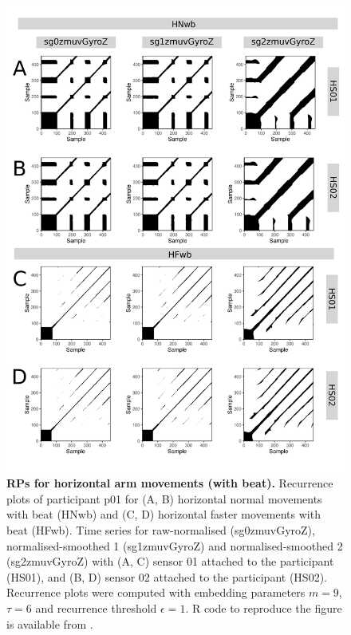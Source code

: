\begin{figure}[!h]
\centering
\includegraphics[height=0.8\textheight]{rps_Hwb_w500}
\caption{
	{\bf RPs for horizontal arm movements (with beat).}	
	Recurrence plots of participant p01 for 
	(A, B) horizontal normal movements with beat (HNwb) and
	(C, D) horizontal faster movements with beat (HFwb).
	Time series for raw-normalised (sg0zmuvGyroZ), 
	normalised-smoothed 1 (sg1zmuvGyroZ) and 
	normalised-smoothed 2 (sg2zmuvGyroZ) with
	(A, C) sensor 01 attached to the participant (HS01), and
	(B, D) sensor 02 attached to the participant (HS02).
	Recurrence plots were computed with 
	embedding parameters $m=9$, $\tau=6$ and 
	recurrence threshold $\epsilon=1$.
	R code to reproduce the figure is available from \cite{hwum2018}.
        }
    \label{fig:rps_Hwb_w500}
\end{figure}

